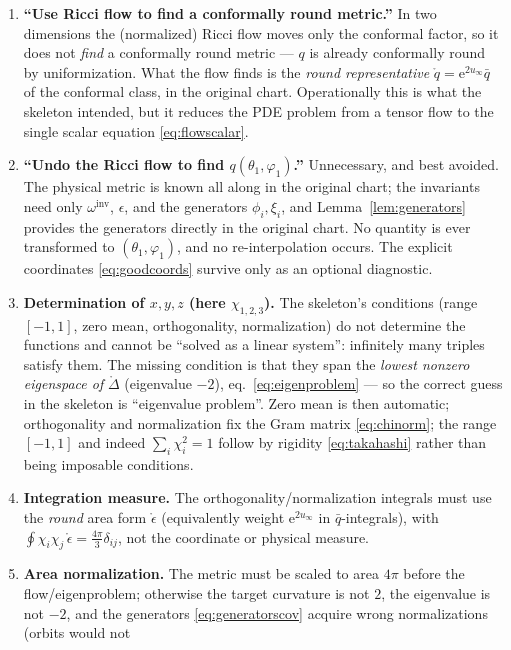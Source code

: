\documentclass[11pt]{article}
\newcommand{\ee}{\mathrm{e}}
\newcommand{\qo}{\mathring{q}}          %
\newcommand{\epso}{\mathring{\epsilon}} %
\newcommand{\Lapo}{\mathring{\Delta}}   %
\begin{document}
\begin{enumerate}
\item \textbf{``Use Ricci flow to find a conformally round metric.''}
  In two dimensions the (normalized) Ricci flow moves only the conformal
  factor, so it does not \emph{find} a conformally round metric --- $q$ is
  already conformally round by uniformization.  What the flow finds is the
  \emph{round representative} $\qo = \ee^{2u_\infty}\bar q$ of the conformal
  class, in the original chart.  Operationally this is what the skeleton
  intended, but it reduces the PDE problem from a tensor flow to the single
  scalar equation \eqref{eq:flowscalar}.
\item \textbf{``Undo the Ricci flow to find $q(\theta_1,\varphi_1)$.''}
  Unnecessary, and best avoided.  The physical metric is known all along in
  the original chart; the invariants need only $\omega^{\mathrm{inv}}$,
  $\epsilon$, and the generators $\phi_i,\xi_i$, and
  Lemma~\ref{lem:generators} provides the generators directly in the
  original chart.  No quantity is ever transformed to
  $(\theta_1,\varphi_1)$, and no re-interpolation occurs.  The explicit
  coordinates \eqref{eq:goodcoords} survive only as an optional diagnostic.
\item \textbf{Determination of $x,y,z$ (here $\chi_{1,2,3}$).}  The
  skeleton's conditions (range $[-1,1]$, zero mean, orthogonality,
  normalization) do not determine the functions and cannot be ``solved as a
  linear system'': infinitely many triples satisfy them.  The missing
  condition is that they span the \emph{lowest nonzero eigenspace of}
  $\Lapo$ (eigenvalue $-2$), eq.~\eqref{eq:eigenproblem} --- so the correct
  guess in the skeleton is ``eigenvalue problem''.  Zero mean is then
  automatic; orthogonality and normalization fix the Gram matrix
  \eqref{eq:chinorm}; the range $[-1,1]$ and indeed
  $\sum_i\chi_i^2 = 1$ follow by rigidity \eqref{eq:takahashi} rather than
  being imposable conditions.
\item \textbf{Integration measure.}  The orthogonality/normalization
  integrals must use the \emph{round} area form $\epso$ (equivalently weight
  $\ee^{2u_\infty}$ in $\bar q$-integrals), with
  $\oint\chi_i\chi_j\,\epso = \frac{4\pi}{3}\delta_{ij}$, not the coordinate
  or physical measure.
\item \textbf{Area normalization.}  The metric must be scaled to area $4\pi$
  before the flow/eigenproblem; otherwise the target curvature is not $2$,
  the eigenvalue is not $-2$, and the generators
  \eqref{eq:generatorscov} acquire wrong normalizations (orbits would not

\end{enumerate}
\end{document}
